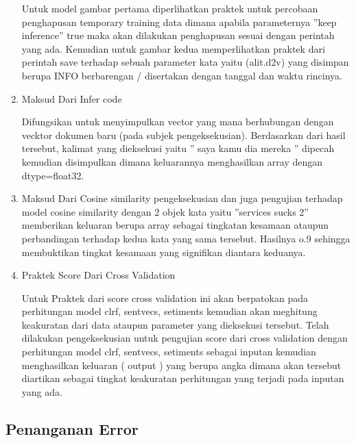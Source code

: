 \begin{enumerate}
			\par Untuk model gambar pertama diperlihatkan praktek untuk percobaan penghapusan temporary training data dimana apabila parameternya ”keep inference” true maka akan dilakukan penghapusan sesuai dengan perintah yang ada. Kemudian untuk gambar kedua memperlihatkan praktek dari perintah save terhadap sebuah parameter kata yaitu (alit.d2v) yang disimpan berupa INFO berbarengan / disertakan dengan tanggal dan waktu rincinya.

			\item Maksud Dari Infer code
			\par Difungsikan untuk menyimpulkan vector yang mana berhubungan dengan vecktor dokumen baru (pada subjek pengeksekusian). 
			Berdasarkan dari hasil tersebut, kalimat yang dieksekusi yaitu ” saya kamu dia mereka ” dipecah kemudian disimpulkan dimana keluarannya menghasilkan array dengan dtype=ﬂoat32.

			\item Maksud Dari Cosine similarity
			pengeksekusian dan juga pengujian terhadap model cosine similarity dengan 2 objek kata yaitu ”services sucks 2” memberikan keluaran berupa array sebagai tingkatan kesamaan ataupun perbandingan terhadap kedua kata yang sama tersebut. Hasilnya o.9 sehingga membuktikan tingkat kesamaan yang signiﬁkan diantara keduanya.

			\item Praktek Score Dari Cross Validation
			\par Untuk Praktek dari score cross validation ini akan berpatokan pada perhitungan model clrf, sentvecs, setiments kemudian akan meghitung keakuratan dari data ataupun parameter yang dieksekusi tersebut. Telah dilakukan pengeksekusian untuk pengujian score dari cross validation dengan perhitungan model clrf, sentvecs, setiments sebagai inputan kemudian menghasilkan keluaran ( output ) yang berupa angka dimana akan tersebut diartikan sebagai tingkat keakuratan perhitungan yang terjadi pada inputan yang ada.

   		\end{enumerate}
   	\subsection{Penanganan Error}
